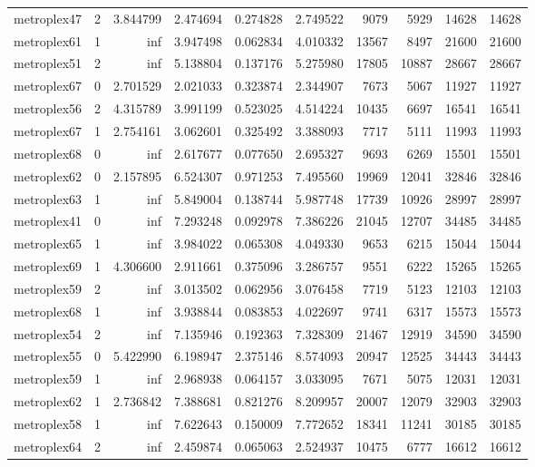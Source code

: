 \begin{longtable}{|l|r|r|r|r|r|r|r|r|r|}
metroplex47 & 2 & 3.844799 & 2.474694 & 0.274828 & 2.749522 & 9079 & 5929 & 14628 & 14628 \\
metroplex61 & 1 & inf & 3.947498 & 0.062834 & 4.010332 & 13567 & 8497 & 21600 & 21600 \\
metroplex51 & 2 & inf & 5.138804 & 0.137176 & 5.275980 & 17805 & 10887 & 28667 & 28667 \\
metroplex67 & 0 & 2.701529 & 2.021033 & 0.323874 & 2.344907 & 7673 & 5067 & 11927 & 11927 \\
metroplex56 & 2 & 4.315789 & 3.991199 & 0.523025 & 4.514224 & 10435 & 6697 & 16541 & 16541 \\
metroplex67 & 1 & 2.754161 & 3.062601 & 0.325492 & 3.388093 & 7717 & 5111 & 11993 & 11993 \\
metroplex68 & 0 & inf & 2.617677 & 0.077650 & 2.695327 & 9693 & 6269 & 15501 & 15501 \\
metroplex62 & 0 & 2.157895 & 6.524307 & 0.971253 & 7.495560 & 19969 & 12041 & 32846 & 32846 \\
metroplex63 & 1 & inf & 5.849004 & 0.138744 & 5.987748 & 17739 & 10926 & 28997 & 28997 \\
metroplex41 & 0 & inf & 7.293248 & 0.092978 & 7.386226 & 21045 & 12707 & 34485 & 34485 \\
metroplex65 & 1 & inf & 3.984022 & 0.065308 & 4.049330 & 9653 & 6215 & 15044 & 15044 \\
metroplex69 & 1 & 4.306600 & 2.911661 & 0.375096 & 3.286757 & 9551 & 6222 & 15265 & 15265 \\
metroplex59 & 2 & inf & 3.013502 & 0.062956 & 3.076458 & 7719 & 5123 & 12103 & 12103 \\
metroplex68 & 1 & inf & 3.938844 & 0.083853 & 4.022697 & 9741 & 6317 & 15573 & 15573 \\
metroplex54 & 2 & inf & 7.135946 & 0.192363 & 7.328309 & 21467 & 12919 & 34590 & 34590 \\
metroplex55 & 0 & 5.422990 & 6.198947 & 2.375146 & 8.574093 & 20947 & 12525 & 34443 & 34443 \\
metroplex59 & 1 & inf & 2.968938 & 0.064157 & 3.033095 & 7671 & 5075 & 12031 & 12031 \\
metroplex62 & 1 & 2.736842 & 7.388681 & 0.821276 & 8.209957 & 20007 & 12079 & 32903 & 32903 \\
metroplex58 & 1 & inf & 7.622643 & 0.150009 & 7.772652 & 18341 & 11241 & 30185 & 30185 \\
metroplex64 & 2 & inf & 2.459874 & 0.065063 & 2.524937 & 10475 & 6777 & 16612 & 16612 \\

\end{longtable}
